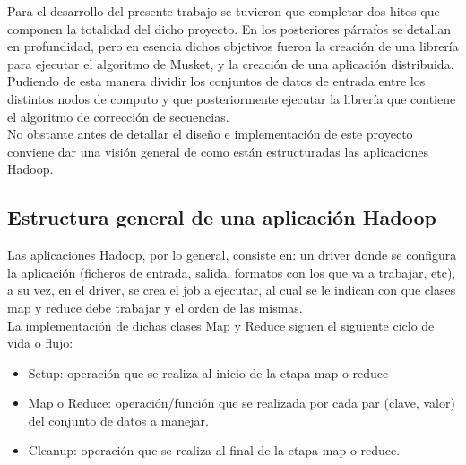 \documentclass[conference]{IEEEtran}
\begin{document}
Para el desarrollo del presente trabajo se tuvieron que completar dos hitos que componen la totalidad del dicho proyecto. En los posteriores párrafos se detallan en profundidad, pero en esencia dichos objetivos fueron la creación de una librería para ejecutar el algoritmo de Musket, y la creación de una aplicación distribuida. Pudiendo de esta manera dividir los conjuntos de datos de entrada entre los distintos nodos de computo y que posteriormente ejecutar la librería que contiene el algoritmo de corrección de secuencias.\\

No obstante antes de detallar el diseño e implementación de este proyecto conviene dar una visión general de como están estructuradas las aplicaciones Hadoop.

\subsection{Estructura general de una aplicación Hadoop}
Las aplicaciones Hadoop, por lo general, consiste en: un driver donde se configura la aplicación (ficheros de entrada, salida, formatos con los que va a trabajar, etc), a su vez, en el driver, se crea el job a ejecutar, al cual se le indican con que clases map y reduce debe trabajar y el orden de las mismas.\\
La implementación de dichas clases Map y Reduce siguen el siguiente ciclo de vida o flujo:

\begin{itemize}
	\item Setup: operación que se realiza al inicio de la etapa map o reduce
	\item Map o Reduce: operación/función que se realizada por cada par (clave, valor) del conjunto de datos a manejar.
	\item Cleanup: operación que se realiza al final de la etapa map o reduce.
\end{itemize}
\end{document}
